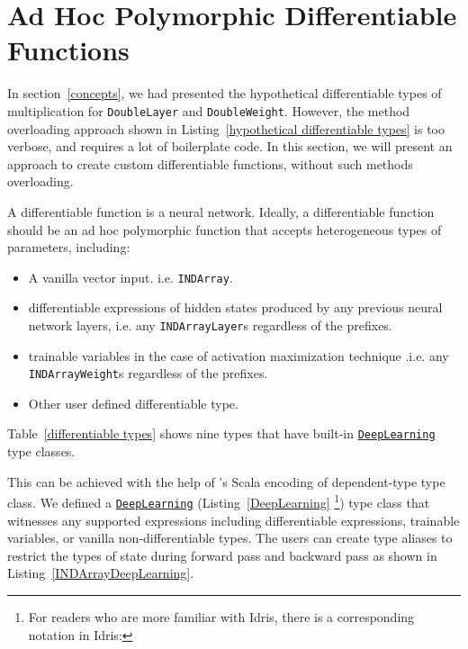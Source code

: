 \section{Ad Hoc Polymorphic Differentiable Functions}
\label{Ad Hoc Polymorphism} 

In section~\ref{concepts}, we had presented the hypothetical differentiable types of multiplication for \lstinline{DoubleLayer} and \lstinline{DoubleWeight}. However, the method overloading approach shown in Listing~\ref{hypothetical differentiable types} is too verbose, and requires a lot of boilerplate code. In this section, we will present an approach to create custom \glspl{differentiable function}, without such methods overloading.

A \gls{differentiable function} is a neural network. 
Ideally, a differentiable function should be an ad hoc polymorphic function that accepts heterogeneous types of parameters, including:

\begin{itemize}
  
  \item A vanilla vector input. i.e. \lstinline{INDArray}.

  \item \Glspl{differentiable expression} of hidden states produced by any previous neural network layers, i.e. any \lstinline{INDArrayLayer}s regardless of the prefixes.
  
  \item \Glspl{trainable variable} in the case of activation maximization technique \cite{erhan2009visualizing}.i.e. any \lstinline{INDArrayWeight}s regardless of the prefixes.
  
  \item Other user defined differentiable type.

\end{itemize}

Table~\ref{differentiable types} shows nine types that have built-in \href{https://javadoc.io/page/com.thoughtworks.deeplearning/deeplearning_2.11/latest/com/thoughtworks/deeplearning/DeepLearning.html}{\lstinline{DeepLearning}} type classes.

This can be achieved with the help of \cite{gurnelltype}'s Scala encoding of dependent-type type class. We defined a \href{https://javadoc.io/page/com.thoughtworks.deeplearning/deeplearning_2.11/latest/com/thoughtworks/deeplearning/DeepLearning.html}{\lstinline{DeepLearning}} (Listing~\ref{DeepLearning} \footnote{
For readers who are more familiar with Idris, there is a corresponding notation in Idris:
\par\usebox{\IdrisDeepLearning}
}) type class that witnesses any supported expressions including \glspl{differentiable expression}, \glspl{trainable variable}, or vanilla non-differentiable types. The users can create type aliases to restrict the types of state during forward pass and backward pass as shown in Listing~\ref{INDArrayDeepLearning}.

